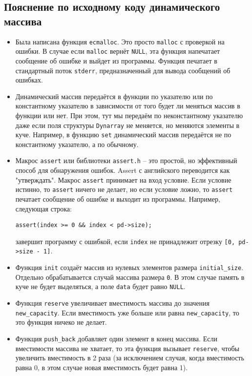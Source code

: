 \documentclass[10pt]{article}
\begin{document}
\newpage
\subsection*{Пояснение по исходному коду динамического массива}

\begin{itemize}
\item Была написана функция \texttt{ecmalloc}. Это просто \texttt{malloc} с проверкой на ошибки. В случае если \texttt{malloc} вернёт \texttt{NULL}, эта функция напечатает сообщение об ошибке и выйдет из программы. Функция печатает в стандартный поток \texttt{stderr}, предназначенный для вывода сообщений об ошибках.

\item Динамический массив передаётся в функции по указателю или по константному указателю в зависимости от того будет ли меняться массив в функции или нет. При этом, тут мы передаём по неконстантному указателю даже если поля структуры \texttt{Dynarray} не меняется, но меняются элементы в куче. Например, в функцию \texttt{set} динамический массив передаётся не по константному указателю, а по обычному.

\item Макрос \texttt{assert} или библиотеки \texttt{assert.h} -- это простой, но эффективный способ для обнаружения ошибок. Assert с английского переводится как "утверждать". Макрос \texttt{assert} принимает на вход условие. Если условие истинно, то \texttt{assert} ничего не делает, но если условие ложно, то \texttt{assert} печатает сообщение об ошибке и выходит из программы. Например, следующая строка:
\begin{lstlisting}
assert(index >= 0 && index < pd->size);
\end{lstlisting}
завершит программу с ошибкой, если \texttt{index} не принадлежит отрезку \texttt{[0, pd->size - 1]}.


\item Функция \texttt{init} создаёт массив из нулевых элементов размера \texttt{initial\_size}. Отдельно обрабатывается случай массива размера \texttt{0}. В этом случае память в куче не будет выделяться, а поле \texttt{data} будет равно \texttt{NULL}.

\item Функция \texttt{reserve} увеличивает вместимость массива до значения \texttt{new\_capacity}. Если вместимость уже больше или равна \texttt{new\_capacity}, то это функция ничеко не делает.

\item Функция \texttt{push\_back} добавляет один элемент в конец массива. Если вместимости массива не хватает, то эта функция вызывает \texttt{reserve}, чтобы увеличить вместимость в 2 раза (за исключением случая, когда вместимость равна 0, в этом случае новая вместимость будет равна 1). 
\end{itemize}
\end{document}
